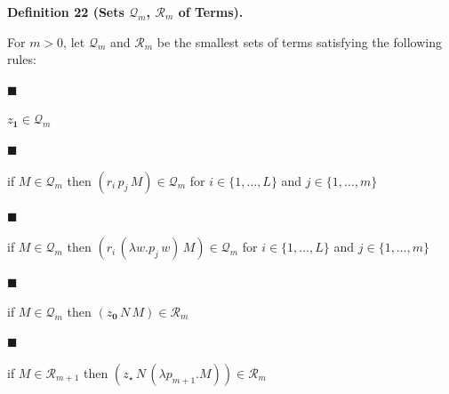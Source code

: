  
 
\par\medskip\noindent\textbf{Definition 22 (Sets $\mathcal{Q}_{m}$, $\mathcal{R}_{m}$ of Terms).}\par
 
 
For $m>0$, let $\mathcal{Q}_{m}$ and $\mathcal{R}_{m}$ be the smallest sets of terms satisfying the following rules:\par
  
\par\noindent  $\blacksquare$ 
 
$z_{\mathbf{1}}\in\mathcal{Q}_{m}$\par
 
 
 
\par\noindent  $\blacksquare$ 
 
if $M\in\mathcal{Q}_{m}$ then $(r_{i}\,p_{j}\,M)\in\mathcal{Q}_{m}$ for $i\in\{1,\ldots,L\}$ and $j\in\{1,\ldots,m\}$\par
 
 
 
\par\noindent  $\blacksquare$ 
 
if $M\in\mathcal{Q}_{m}$ then $(r_{i}\,(\lambda w.p_{j}\,w)\,M)\in\mathcal{Q}_{m}$ for $i\in\{1,\ldots,L\}$ and $j\in\{1,\ldots,m\}$\par
 
 
 
\par\noindent  $\blacksquare$ 
 
if $M\in\mathcal{Q}_{m}$ then $(z_{\mathbf{0}}\,N\,M)\in\mathcal{R}_{m}$\par
 
 
 
\par\noindent  $\blacksquare$ 
 
if $M\in\mathcal{R}_{m+1}$ then $(z_{\star}\,N\,(\lambda p_{m+1}.M))\in\mathcal{R}_{m}$\par
 
 
  
 
 
 
